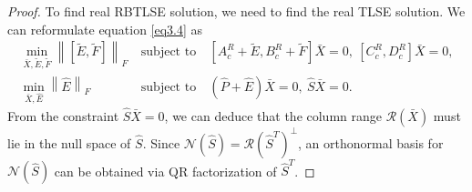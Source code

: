 \documentclass[preprint,11pt,3p]{elsarticle}
\newcommand\norm[1]{\left\lVert#1\right\rVert}
\begin{document}
\begin{proof}
	To find real RBTLSE solution, we need to find the real TLSE solution. We can reformulate equation \eqref{eq3.4} as
	\begin{eqnarray}
		\min_{ \bar{X}, \widetilde{E},\widetilde{F}} \norm{[\widetilde{E}, \widetilde{F}]}_F ~ &\textrm{subject to}& ~ \left[A^R_c+\widetilde{E}, B^R_c+\widetilde{F}\right]\bar{X} =  0, ~ \left[C^R_c, D^R_c\right]\bar{X}=0, \nonumber \\
		\min_{ \bar{X}, \hat{E}} \norm{\hat{E}}_F ~ &\textrm{subject to}& ~ \left(\hat{P}+\hat{E} \right)\bar{X} =  0, ~ \hat{S}\bar{X}=0. \label{eqpfr2.1} 
	\end{eqnarray}
From the constraint $\hat{S}\bar{X} = 0$, we can deduce that the column range $\mathcal{R}(\bar{X})$ must lie in the null space of $\hat{S}$. Since $\mathcal{N}(\hat{S}) = \mathcal{R}(\hat{S}^T)^{\perp}$, an orthonormal basis for $\mathcal{N}(\hat{S})$ can be obtained via QR factorization of $\hat{S}^T$.


\end{proof}
\end{document}
